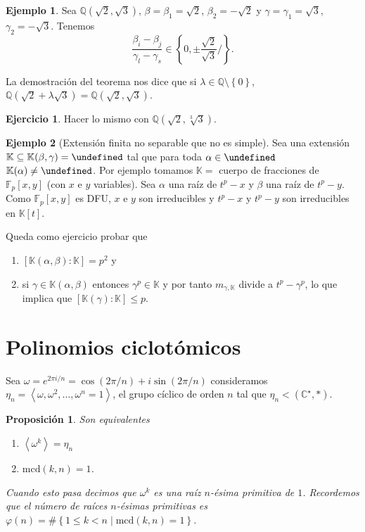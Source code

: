 \documentclass[10pt, spanish]{report}
\newtheorem{prop}[tma]{Proposición}
\theoremstyle{definition}
\newtheorem*{ej}{Ejemplo}
\theoremstyle{custom}
\newtheorem*{ejer}{Ejercicio}
\theoremstyle{remark}
\newcommand{\Q}{\mathbb{Q}}
\newcommand{\C}{\mathbb{C}}
\newcommand{\F}{\mathbb{F}}
\newcommand{\K}{\mathbb{K}}
\let\L\undefined
\newcommand{\L}{\mathbb{L}}
\newcommand{\mcd}[1]{\text{mcd}(#1)}
\renewcommand{\leq}{\leqslant}
\newcommand{\fecha}[1]{\marginpar{\underline{\footnotesize{#1}}}}
\begin{document}
\begin{ej}
    Sea $\Q(\sqrt{2},\sqrt{3})$, $\beta=\beta_1=\sqrt{2}$, $\beta_2=-\sqrt{2}$ y
    $\gamma=\gamma_1=\sqrt{3}$, $\gamma_2=-\sqrt{3}$. Tenemos
    \[\frac{\beta_i-\beta_j}{\gamma_l-\gamma_s}\in\left\{ 0,\pm\frac{\sqrt{2}
    }{\sqrt{3} }/ \right\}.\]

    La demostración del teorema nos dice que si $\lambda\in\Q\setminus\left\{0
    \right\}$, $\Q(\sqrt{2}+\lambda\sqrt{3})=\Q(\sqrt{2},\sqrt{3})$.
\end{ej}

\begin{ejer}
    Hacer lo mismo con $\Q(\sqrt{2},\sqrt[3]{3})$.
\end{ejer}

\begin{ej}[Extensión finita no separable que no es simple]
    Sea una extensión $\K\subseteq\K(\beta,\gamma)=\L$ tal que para toda $\alpha
    \in\L$ $\K(\alpha)\neq \L$. Por ejemplo tomamos $\K = $ cuerpo de fracciones
    de $\F_p[x,y]$ (con $x$ e $y$ variables). Sea $\alpha$ una raíz de $t^p-x$ y
    $\beta$ una raíz de $t^p-y$. Como $\F_p[x,y]$ es DFU, $x$ e $y$ son
    irreducibles y $t^p-x$ y $t^p-y$ son irreducibles en $\K[t]$.

    Queda como ejercicio probar que
    \begin{enumerate}
        \item $\left[ \K(\alpha,\beta):\K \right] =p^2$ y
        \item si $\gamma\in\K(\alpha,\beta)$ entonces $\gamma^p \in\K$ y por
            tanto $m_{\gamma,\K}$ divide a $t^p-\gamma^p$, lo que implica que
            $[\K(\gamma):\K]\leq p$.  \end{enumerate}
\end{ej}

\fecha{6/04}
\section{Polinomios ciclotómicos}

Sea $\omega=e^{2\pi i / n}=\cos(2\pi /n)+ i \sin(2\pi /n)$ consideramos $\eta_n=
\left< \omega,\omega^2,\dots,\omega^n=1 \right> $, el grupo cíclico de orden $n$
tal que $\eta_n < (\C^\star, *)$.

\begin{prop}
    Son equivalentes
    \begin{enumerate}
        \item $\left< \omega^k \right> = \eta_n$ 
        \item $\mcd{k,n}=1$.
    \end{enumerate}
    Cuando esto pasa decimos que $\omega^k$ es una raíz $n$-ésima primitiva de
    $1$. Recordemos que el número de raíces $n$-ésimas primitivas es
    $\varphi(n)=\#\left\{ 1\leq k<n\mid \mcd{k,n}=1 \right\}$.  
\end{prop}
\end{document}
